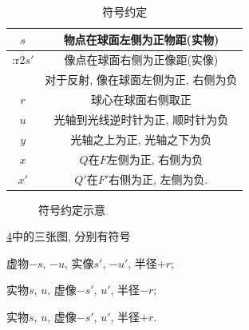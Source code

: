 \documentclass{ctexart}
\begin{document}
\begin{table}[ht]
    \centering
        \begin{tabular}{|c|c|}
            \hline
            $s$ & 物点在球面左侧为正物距(实物)\\
            \hline
            \+:r2{$s'$} & 像点在球面右侧为正像距(实像) \\
            & 对于反射, 像在球面左侧为正, 右侧为负 \\
            \hline
            $r$ & 球心在球面右侧取正 \\
            \hline
            $u$ & 光轴到光线逆时针为正, 顺时针为负\\
            \hline
            $y$ & 光轴之上为正, 光轴之下为负 \\
            \hline
            $x$ & $Q$在$F$左侧为正, 右侧为负 \\
            \hline
            $x'$ & $Q'$在$F'$右侧为正, 左侧为负. \\
            \hline
        \end{tabular}
    \caption{符号约定}
    \label{table:符号约定}
\end{table}
\setlength\extrarowheight{0pt}
\begin{figure}[ht]
    \centering
    \begin{subfigure}{.3\textwidth}
        \centering
        \caption{}
        \label{fig:符号约定示意1}
    \end{subfigure}
    \begin{subfigure}{.3\textwidth}
        \centering
        \caption{}
        \label{fig:符号约定示意2}
    \end{subfigure}
    \begin{subfigure}{.3\textwidth}
        \centering
        \caption{}
        \label{fig:符号约定示意3}
    \end{subfigure}
    \caption{符号约定示意}
    \label{fig:符号约定示意}
\end{figure}
\begin{sample}
    \begin{ex}
        \cref{fig:符号约定示意}中的三张图, 分别有符号
        \begin{cenum}
            \item 虚物$-s$, $-u$, 实像$s'$, $-u'$, 半径$+r$;
            \item 实物$s$, $u$, 虚像$-s'$, $u'$, 半径$-r$;
            \item 实物$s$, $u$, 虚像$-s'$, $u'$, 半径$+r$.
        \end{cenum}
    \end{ex}
\end{sample}
\end{document}
